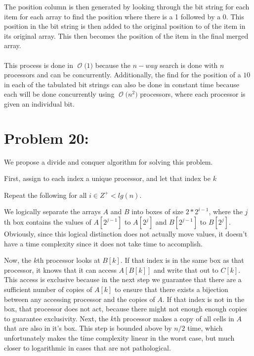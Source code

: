 \documentclass[12pt]{article}
\newcommand{\BigO}[1]{\ensuremath{\operatorname{\mathcal{O}}\bigl(#1\bigr)}}
\begin{document}
The position column is then generated by looking through the bit
string for each item for each array to find the position where 
there is a 1 followed by a 0.  This position in the bit string 
is then added to the original position to of the item in its 
original array.  This then becomes the position of the item
in the final merged array.\\\\
This process is done in \BigO{1} because the $n-way$ search
is done with $n$ processors and can be concurrently.  Additionally,
the find for the position of a $10$ in each of the tabulated
bit strings can also be done in constant time because each will
be done concurrently using \BigO{n^2} processors, where each processor
is given an individual bit.             
\section*{Problem 20: }

We propose a divide and conquer algorithm for solving this problem.

First, assign to each index a unique processor, and let that index be $k$

Repeat the following for all $i \in Z^{+} < lg(n)$.

We logically separate the arrays $A$ and $B$ into boxes of size $2*2^{i-1}$, where the $j$th box contains the values of $A[2^{j-1}]$ to $A[2^{j}]$ and $B[2^{j-1}]$ to $B[2^{j}]$. Obviously, since this logical distinction does not actually move values, it doesn't have a time complexity since it does not take time to accomplish.

Now, the $k$th processor looks at $B[k]$. If that index is in the same box as that processor, it knows that it can access  $A[B[k]]$ and write that out to $C[k]$. This access is exclusive because in the next step we guarantee that there are a sufficient number of copies of $A[k]$ to ensure that there exists a bijection between any accessing processor and the copies of $A$. If that index is not in the box, that processor does not act, because there might not enough enough copies to guarantee exclusivity. Next, the $k$th processor makes a copy of all cells in $A$ that are also in it's box. This step is bounded above by $n/2$ time, which unfortunately makes the time complexity linear in the worst case, but much closer to logarithmic in cases that are not pathological.
\end{document}
